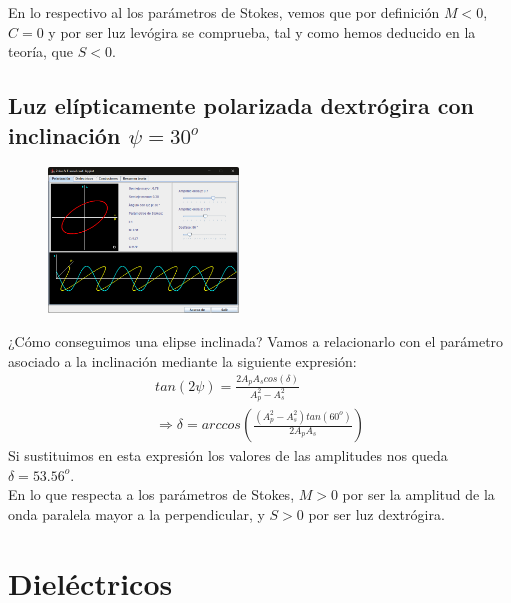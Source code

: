 \documentclass[11pt]{article}
\begin{document}
    \noindent En lo respectivo al los parámetros de Stokes, vemos que por definición $M < 0$, $C = 0$ y por ser luz levógira se comprueba, tal y como hemos deducido en la teoría, que $S < 0$.
    \newpage
    \subsection{Luz elípticamente polarizada dextrógira con inclinación $\psi = 30^o$}
    \begin{figure}
        \vspace{-0.6cm}
        \centering
        \includegraphics[width=0.45\textwidth]{fotos/eliptica dext 30.png}
    \end{figure}
    \noindent ¿Cómo conseguimos una elipse inclinada? Vamos a relacionarlo con el parámetro asociado a la inclinación mediante la siguiente expresión:
    \begin{equation}
    \begin{split}
        tan(2\psi) = \frac{2A_pA_scos(\delta)}{A_p^2-A_s^2} \\\Longrightarrow \delta = arccos\left(\frac{(A_p^2-A_s^2)tan(60^o)}{2A_pA_s}\right)
    \end{split}
    \end{equation}
    \noindent Si sustituimos en esta expresión los valores de las amplitudes nos queda $\delta = 53.56^o$.\\

    \noindent En lo que respecta a los parámetros de Stokes, $M > 0$ por ser la amplitud de la onda paralela mayor a la perpendicular, y $S > 0$ por ser luz dextrógira.
    
    
    \newpage
    \section{Dieléctricos}
    
\end{document}
